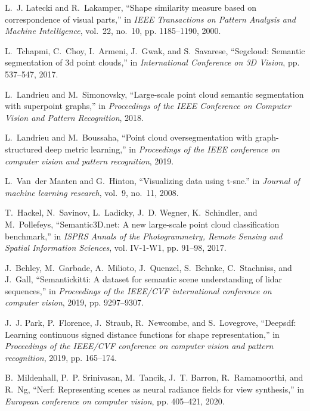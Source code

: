 \begin{thebibliography}{1}
L.~J. Latecki and R.~Lakamper, ``Shape similarity measure based on
  correspondence of visual parts,'' in \emph{IEEE Transactions on Pattern Analysis
  and Machine Intelligence}, vol.~22, no.~10, pp. 1185--1190, 2000.

L.~Tchapmi, C.~Choy, I.~Armeni, J.~Gwak, and S.~Savarese, ``Segcloud: Semantic
  segmentation of 3d point clouds,'' in \emph{International Conference on 3D
  Vision}, pp. 537--547, 2017.

L.~Landrieu and M.~Simonovsky, ``Large-scale point cloud semantic segmentation
  with superpoint graphs,'' in \emph{Proceedings of the IEEE Conference on
  Computer Vision and Pattern Recognition}, 2018.

L.~Landrieu and M.~Boussaha, ``Point cloud oversegmentation with
  graph-structured deep metric learning,'' in \emph{Proceedings of the IEEE
  conference on computer vision and pattern recognition}, 2019.

L.~Van~der Maaten and G.~Hinton, ``Visualizing data using t-sne.''
in \emph{Journal of machine learning research}, vol.~9, no.~11, 2008.

T.~Hackel, N.~Savinov, L.~Ladicky, J.~D. Wegner, K.~Schindler, and
  M.~Pollefeys, ``Semantic{3D}.net: A new large-scale point cloud
  classification benchmark,'' in \emph{ISPRS Annals of the Photogrammetry, Remote
  Sensing and Spatial Information Sciences}, vol. IV-1-W1, pp. 91--98, 2017.

J.~Behley, M.~Garbade, A.~Milioto, J.~Quenzel, S.~Behnke, C.~Stachniss, and
  J.~Gall, ``Semantickitti: A dataset for semantic scene understanding of lidar
  sequences,'' in \emph{Proceedings of the IEEE/CVF international conference on
  computer vision}, 2019, pp. 9297--9307.

J.~J. Park, P.~Florence, J.~Straub, R.~Newcombe, and S.~Lovegrove, ``Deepsdf:
  Learning continuous signed distance functions for shape representation,'' in
  \emph{Proceedings of the IEEE/CVF conference on computer vision and pattern
  recognition}, 2019, pp. 165--174.

B.~Mildenhall, P.~P. Srinivasan, M.~Tancik, J.~T. Barron, R.~Ramamoorthi, and
  R.~Ng, ``Nerf: Representing scenes as neural radiance fields for view
  synthesis,'' in \emph{European conference on computer vision}, pp. 405--421, 2020.


\end{thebibliography}
